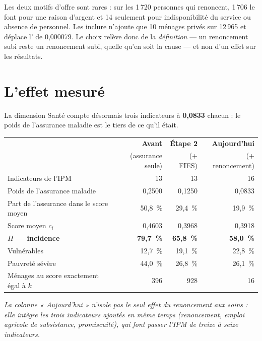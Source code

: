 \documentclass[11pt,a4paper]{article}
\begin{document}
\begin{retenir}
Les deux motifs d'offre sont rares : sur les 1\,720 personnes qui renoncent, 1\,706 le font pour
une raison d'argent et 14 seulement pour indisponibilité du service ou absence de personnel. Les
inclure n'ajoute que 10 ménages privés sur 12\,965 et déplace l'\ipm{} de 0,000079. Le choix
relève donc de la \emph{définition} --- un renoncement subi reste un renoncement subi, quelle
qu'en soit la cause --- et non d'un effet sur les résultats.
\end{retenir}

\section{L'effet mesuré}

La dimension Santé compte désormais trois indicateurs à \textbf{0,0833} chacun : le poids de
l'assurance maladie est le tiers de ce qu'il était.

\begin{center}
\small
\begin{tabular}{@{}lrrr@{}}
\toprule
& \textbf{Avant} & \textbf{Étape 2} & \textbf{Aujourd'hui} \\
& \small(assurance seule) & \small(+ FIES) & \small(+ renoncement) \\
\midrule
Indicateurs de l'IPM & 13 & 13 & 16 \\
Poids de l'assurance maladie & 0,2500 & 0,1250 & 0,0833 \\
Part de l'assurance dans le score moyen & 50,8~\% & 29,4~\% & 19,9~\% \\
Score moyen $c_i$ & 0,4603 & 0,3968 & 0,3918 \\
\textbf{$H$ --- incidence} & \textbf{79,7~\%} & \textbf{65,8~\%} & \textbf{58,0~\%} \\
Vulnérables & 12,7~\% & 19,1~\% & 22,8~\% \\
Pauvreté sévère & 44,0~\% & 26,8~\% & 26,1~\% \\
Ménages au score exactement égal à $k$ & 396 & 928 & 16 \\
\bottomrule
\end{tabular}
\end{center}

\emph{La colonne « Aujourd'hui » n'isole pas le seul effet du renoncement aux soins : elle intègre
les trois indicateurs ajoutés en même temps (renoncement, emploi agricole de subsistance,
promiscuité), qui font passer l'IPM de treize à seize indicateurs.}
\end{document}
